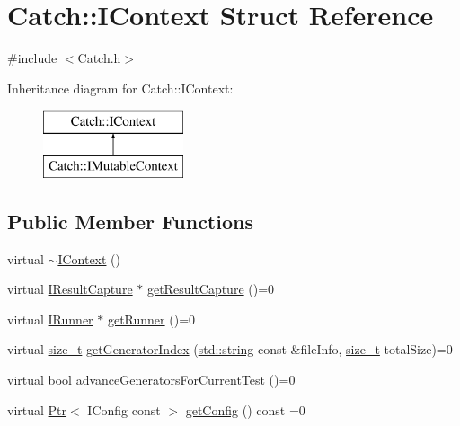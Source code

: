 \hypertarget{struct_catch_1_1_i_context}{}\section{Catch\+:\+:I\+Context Struct Reference}
\label{struct_catch_1_1_i_context}


{\ttfamily \#include $<$Catch.\+h$>$}

Inheritance diagram for Catch\+:\+:I\+Context\+:\begin{figure}[H]
\begin{center}
\leavevmode
\includegraphics[height=2.000000cm]{struct_catch_1_1_i_context}
\end{center}
\end{figure}
\subsection*{Public Member Functions}
\begin{DoxyCompactItemize}
\item 
virtual \hyperlink{struct_catch_1_1_i_context_aeb17355c1be6c2ced5407cad7202628d}{$\sim$\+I\+Context} ()
\item 
virtual \hyperlink{struct_catch_1_1_i_result_capture}{I\+Result\+Capture} $\ast$ \hyperlink{struct_catch_1_1_i_context_a684e4ae71d1fdf3060c352ecde1d122f}{get\+Result\+Capture} ()=0
\item 
virtual \hyperlink{struct_catch_1_1_i_runner}{I\+Runner} $\ast$ \hyperlink{struct_catch_1_1_i_context_af088415dde18d039ed5a2f95b02767c6}{get\+Runner} ()=0
\item 
virtual \hyperlink{_s_d_l__config_8h_a7c94ea6f8948649f8d181ae55911eeaf}{size\+\_\+t} \hyperlink{struct_catch_1_1_i_context_a43e07088db43299ba129fbe6d3106e95}{get\+Generator\+Index} (\hyperlink{_s_d_l__opengl__glext_8h_ae84541b4f3d8e1ea24ec0f466a8c568b}{std\+::string} const \&file\+Info, \hyperlink{_s_d_l__config_8h_a7c94ea6f8948649f8d181ae55911eeaf}{size\+\_\+t} total\+Size)=0
\item 
virtual bool \hyperlink{struct_catch_1_1_i_context_a806f7c4ed24d51adae90418e661b24b7}{advance\+Generators\+For\+Current\+Test} ()=0
\item 
virtual \hyperlink{class_catch_1_1_ptr}{Ptr}$<$ I\+Config const  $>$ \hyperlink{struct_catch_1_1_i_context_a9b6759547b9af1e77b6bc9f0dd596ac2}{get\+Config} () const  =0
\end{DoxyCompactItemize}


